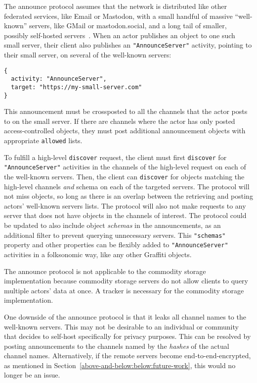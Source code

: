 The announce protocol assumes that the network is distributed like other
federated services, like Email or Mastodon, with a small handful of
massive ``well-known'' servers, like GMail or mastodon.social, and a long
tail of smaller, possibly self-hosted servers~\cite{mastodonchallenges}.
When an actor publishes an object to one such small server,
their client also publishes an \texttt{"AnnounceServer"}
activity, pointing to their small server, on several of the well-known
servers:
\begin{verbatim}
{
  activity: "AnnounceServer",
  target: "https://my-small-server.com"
}
\end{verbatim}
This announcement must be crossposted to all the channels
that the actor posts to on the small server.
If there are channels where the actor has only posted
access-controlled objects, they must post additional announcement
objects with appropriate \texttt{allowed} lists.

To fulfill a high-level \texttt{discover} request,
the client must first \texttt{discover} for
\texttt{"AnnounceServer"} activities in the channels of
the high-level request
on each of the well-known servers.
Then, the client can \texttt{discover} for objects
matching the high-level channels \emph{and} schema on each of the targeted servers.
The protocol will not miss objects, so long as there
is an overlap between the retrieving and posting actors' well-known
servers lists.
The protocol will also not make requests to any server
that does not have objects in the channels of interest.
The protocol could be updated to also include object
\emph{schemas} in the announcements, as an additional
filter to prevent querying unnecessary servers.
This \texttt{"schemas"} property and other properties
can be flexibly added to \texttt{"AnnounceServer"} activities
in a folksonomic way, like any other Graffiti objects.

The announce protocol is not applicable to the commodity storage implementation
because commodity storage servers do not allow clients to
query multiple actors' data at once. A tracker is necessary
for the commodity storage implementation.

One downside of the announce protocol is that it leaks all
channel names to the well-known servers.
This may not be desirable to an individual or community that
decides to self-host specifically for privacy purposes.
This can be resolved by posting announcements to the channels
named by the \emph{hashes} of the actual channel names.
Alternatively, if the remote servers become end-to-end-encrypted,
as mentioned in Section~\ref{above-and-below:below:future-work},
this would no longer be an issue.

